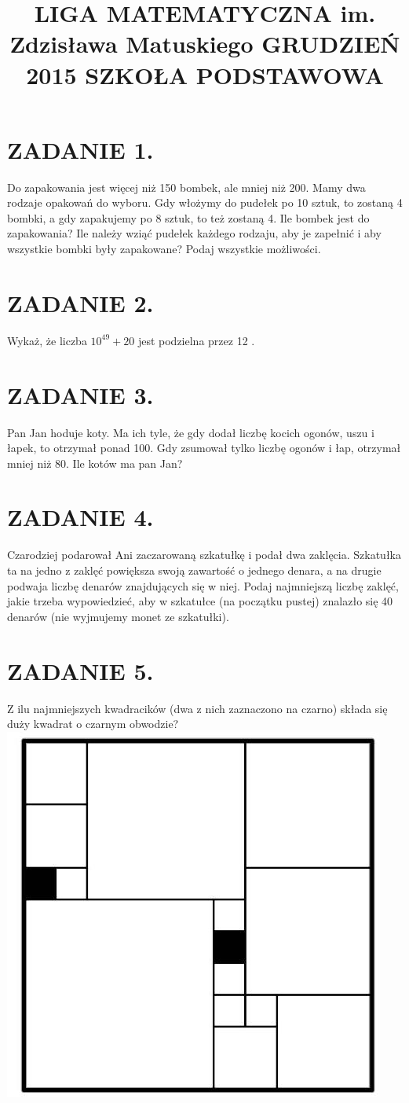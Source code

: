 \documentclass[10pt]{article}
\title{LIGA MATEMATYCZNA im. Zdzisława Matuskiego GRUDZIEŃ 2015 SZKOŁA PODSTAWOWA }
\author{}
\date{}
\begin{document}
\maketitle
\section*{ZADANIE 1.}
Do zapakowania jest więcej niż 150 bombek, ale mniej niż 200. Mamy dwa rodzaje opakowań do wyboru. Gdy włożymy do pudełek po 10 sztuk, to zostaną 4 bombki, a gdy zapakujemy po 8 sztuk, to też zostaną 4. Ile bombek jest do zapakowania? Ile należy wziąć pudełek każdego rodzaju, aby je zapełnić i aby wszystkie bombki były zapakowane? Podaj wszystkie możliwości.

\section*{ZADANIE 2.}
Wykaż, że liczba \(10^{49}+20\) jest podzielna przez 12 .

\section*{ZADANIE 3.}
Pan Jan hoduje koty. Ma ich tyle, że gdy dodał liczbę kocich ogonów, uszu i łapek, to otrzymał ponad 100. Gdy zsumował tylko liczbę ogonów i łap, otrzymał mniej niż 80. Ile kotów ma pan Jan?

\section*{ZADANIE 4.}
Czarodziej podarował Ani zaczarowaną szkatułkę i podał dwa zaklęcia. Szkatułka ta na jedno z zaklęć powiększa swoją zawartość o jednego denara, a na drugie podwaja liczbę denarów znajdujących się w niej. Podaj najmniejszą liczbę zaklęć, jakie trzeba wypowiedzieć, aby w szkatułce (na początku pustej) znalazło się 40 denarów (nie wyjmujemy monet ze szkatułki).

\section*{ZADANIE 5.}
Z ilu najmniejszych kwadracików (dwa z nich zaznaczono na czarno) składa się duży kwadrat o czarnym obwodzie?\\
\includegraphics[max width=\textwidth, center]{2024_11_21_c1950e5afa96ea9dff65g-1}
\end{document}
